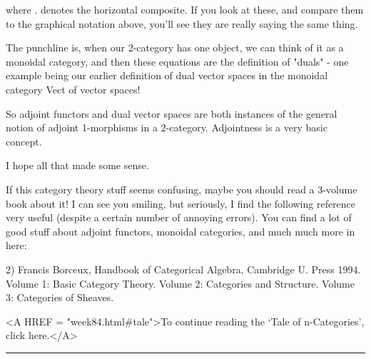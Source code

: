 $$
    
where . denotes the horizontal composite.  If you look at these, and
compare them to the graphical notation above, you'll see they are really
saying the same thing.

The punchline is, when our 2-category has one object, we can think of it
as a monoidal category, and then these equations are the definition of
"duals" - one example being our earlier definition of dual vector
spaces in the monoidal category Vect of vector spaces!

So adjoint functors and dual vector spaces are both instances of 
the general notion of adjoint 1-morphisms in a 2-category.  Adjointness
is a very basic concept.

I hope all that made some sense.  

If this category theory stuff seems confusing, maybe you should read a
3-volume book about it!  I can see you smiling, but seriously, I find
the following reference very useful (despite a certain number of
annoying errors).  You can find a lot of good stuff about adjoint
functors, monoidal categories, and much much more in here:

2) Francis Borceux, Handbook of Categorical Algebra, Cambridge U. Press
1994.  Volume 1: Basic Category Theory.  Volume 2: Categories and
Structure.  Volume 3: Categories of Sheaves.  




<A HREF = "week84.html#tale">To continue reading the `Tale of
n-Categories', click here.</A>



\par\noindent\rule{\textwidth}{0.4pt}
